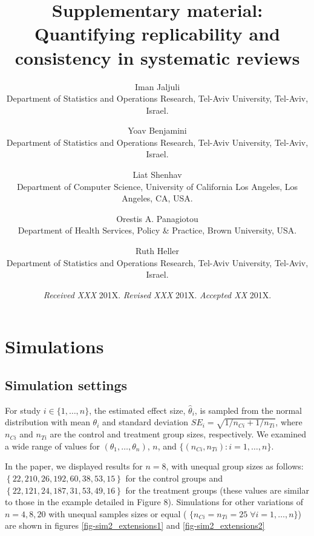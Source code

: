 \documentclass[useAMS,usenatbib,referee]{biom}
\title{Supplementary material: Quantifying replicability and consistency in systematic reviews}
\author{
	Iman Jaljuli\emailx{jaljuli.iman@gmail.com} \\
	Department of Statistics and Operations Research, Tel-Aviv University, Tel-Aviv, Israel.
	\and
	Yoav Benjamini\emailx{ybenja@gmail.com} \\
	Department of Statistics and Operations Research, Tel-Aviv University, Tel-Aviv, Israel.
	\and
	Liat Shenhav\emailx{liashenhav@gmail.com} \\	
	Department of Computer Science, University of California Los Angeles, Los Angeles, CA, USA.
	\and
	Orestis A. Panagiotou\emailx{orestis\_panagiotou@brown.edu} \\	
	Department of Health Services, Policy \& Practice, Brown University, USA.
	\and
	Ruth Heller\emailx{ruheller@gmail.com} \\
	Department of Statistics and Operations Research, Tel-Aviv University, Tel-Aviv, Israel.}
\theoremstyle{plain}
\begin{document}
	
	\date{{\it Received XXX} 201X. {\it Revised XXX} 201X.  {\it
			Accepted XX} 201X.}
	
	\pagerange{\pageref{firstpage}--\pageref{lastpage}} 
	
	
	
	\label{firstpage}
	
	
	
	\maketitle		
	
	
	
	
	\section{Simulations}\label{sec-simulation}
	
	
	\subsection{Simulation settings}	
	
	
	For study $i\in \{1,\ldots,n\}$, the estimated effect size, $\hat \theta_i$, is sampled from the normal distribution with mean $\theta_i$ and standard deviation $SE_i = \sqrt{1/n_{Ci}+1/n_{Ti}}$, where $n_{Ci}$ and $n_{Ti}$ are the control and treatment group sizes, respectively. 
	We examined a wide range of values for $(\theta_1,\ldots, \theta_n)$, $n$, and $\{ (n_{Ci}, n_{Ti}): i=1,\ldots, n\}$. 
	
	In the paper, we displayed results for $n=8$, with unequal group sizes as follows: $ \left\lbrace 22, 210,  26, 192,  60,  38,  53,  15\right\rbrace $ for the control groups and  $ \left\lbrace 22, 121,  24, 187,  31,  53,  49,  16\right\rbrace $ for the treatment groups (these values are similar to those in the example detailed in Figure 8). 
	Simulations for other variations of $n=4,8,20$ with unequal samples sizes or equal  ( $\{ n_{Ci} = n_{Ti} = 25 \; \forall i=1,\ldots, n\}$) are shown in figures \ref{fig-sim2_extensions1} and \ref{fig-sim2_extensions2}
	
\end{document}
